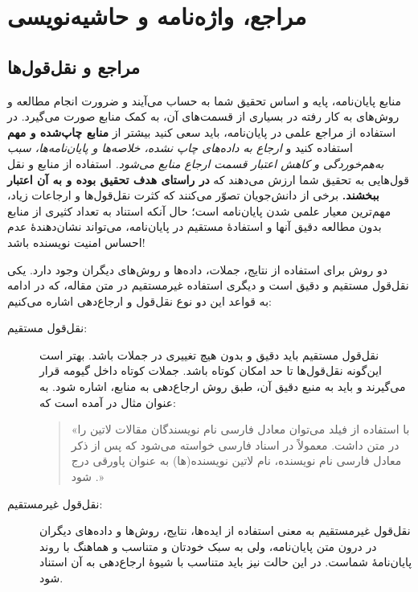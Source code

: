 \chapter{مراجع، واژه‌نامه و حاشیه‌نویسی}
\label{app:refMan}

\section{مراجع و نقل‌قول‌ها}
\label{sec:refUsage}
منابع پایان‌نامه، پایه و اساس تحقیق شما به حساب می‌آیند و ضرورت انجام مطالعه و روش‌های به کار رفته در بسیاری از قسمت‌های آن، به کمک منابع صورت می‌گیرد. در استفاده از مراجع علمی در پایان‌نامه، باید سعی کنید بیشتر از
\textbf{منابع چاپ‌شده و مهم}
استفاده کنید و
\emph{ارجاع به داده‌های چاپ نشده، خلاصه‌ها و پایان‌نامه‌ها، سبب به‌هم‌خوردگی و کاهش اعتبار قسمت ارجاع منابع می‌شود.}
استفاده از منابع و نقل قول‌هایی به تحقیق شما ارزش می‌دهند که
\textbf{در راستای هدف تحقیق بوده و به آن اعتبار ببخشند.}
برخی از دانش‌جویان تصوّر می‌کنند که کثرت نقل‌قول‌ها و ارجاعات زیاد، مهم‌ترین معیار علمی شدن پایان‌نامه است؛ حال آنکه استناد به تعداد کثیری از منابع بدون مطالعه دقیق آنها و استفادهٔ مستقیم در پایان‌نامه، می‌تواند نشان‌دهندهٔ عدم احساس امنیت نویسنده باشد!

دو روش برای استفاده از نتایج، جملات، داده‌ها و روش‌های دیگران وجود دارد. یکی نقل‌قول مستقیم و دقیق است و دیگری استفاده غیرمستقیم در متن مقاله، که در ادامه به قواعد این دو نوع نقل‌قول و ارجاع‌دهی اشاره می‌کنیم:
\begin{description}
	\item[نقل‌قول مستقیم:]
	نقل‌قول مستقیم باید دقیق و بدون هیچ تغییری در جملات باشد. بهتر است این‌گونه نقل‌قول‌ها تا حد امکان کوتاه باشد. جملات کوتاه داخل گیومه قرار می‌گیرند و باید به منبع دقیق آن، طبق روش ارجاع‌دهی به منابع، اشاره شود. به عنوان مثال در
	\cite{persianbib87userguide}
	آمده است که:
	\begin{quote}
		«با استفاده از فیلد
		می‌توان معادل فارسی نام نویسندگان مقالات لاتین را در متن داشت. معمولاً در اسناد فارسی خواسته می‌شود که پس از ذکر معادل فارسی نام نویسنده، نام لاتین نویسنده(ها) به عنوان پاورقی درج شود
		\citep{persianbib87userguide}.»
	\end{quote}
	\item[نقل‌قول غیرمستقیم:]
	نقل‌قول غیرمستقیم به معنی استفاده از ایده‌ها، نتایج، روش‌ها و داده‌های دیگران در درون متن پایان‌نامه، ولی به سبک خودتان و متناسب و هماهنگ با روند پایان‌نامهٔ شماست. در این حالت نیز باید متناسب با شیوهٔ ارجاع‌دهی به آن استناد شود.
\end{description}

